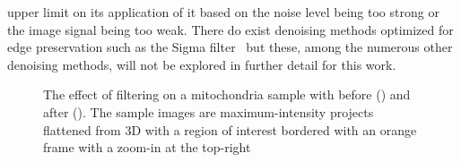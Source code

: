 upper limit on its application of it based on the noise level being too strong or the image signal being too weak. There do exist denoising methods optimized for edge preservation such as the Sigma filter~\cite{sigma_filter} but these, among the numerous other denoising methods, will not be explored in further detail for this work.

\begin{figure}
    \centering
    {}
    \caption[Visual showcase of the effect of filtering on a maximum intensity projection image]{The effect of filtering on a mitochondria sample with before () and after (). The sample images are maximum-intensity projects flattened from 3D with a region of interest bordered with an orange frame with a zoom-in at the top-right}
    \label{fig:denoising_example}
\end{figure}

